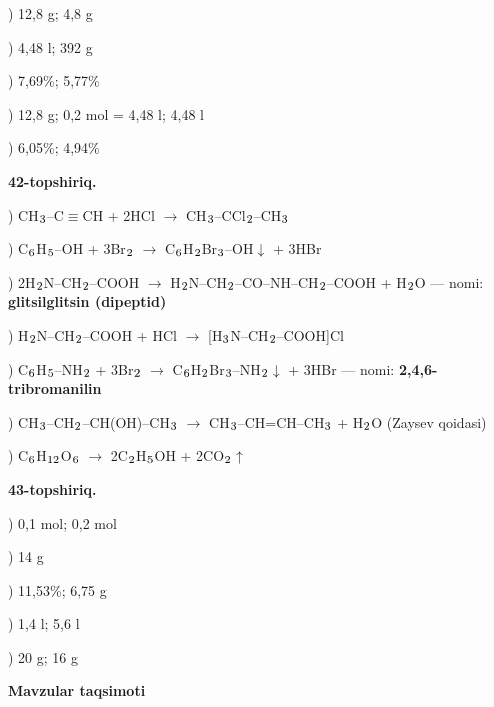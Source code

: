 \documentclass[11pt,a4paper]{article}
\renewcommand{\textsubscript}[1]{\ensuremath{_{\text{\fontsize{8}{8}\selectfont #1}}}}
\begin{document}
) 12,8 g; 4,8 g\par
{}) 4,48 l; 392 g\par
{}) 7,69\%; 5,77\%\par
{}) 12,8 g; 0,2 mol = 4,48 l; 4,48 l\par
{}) 6,05\%; 4,94\%\par
\noindent\textbf{42-topshiriq.}\par
{}) CH\textsubscript{3}--C$\equiv$CH + 2HCl $\to$ CH\textsubscript{3}--CCl\textsubscript{2}--CH\textsubscript{3}\par
{}) C\textsubscript{6}H\textsubscript{5}--OH + 3Br\textsubscript{2} $\to$ C\textsubscript{6}H\textsubscript{2}Br\textsubscript{3}--OH$\downarrow$ + 3HBr\par
{}) 2H\textsubscript{2}N--CH\textsubscript{2}--COOH $\to$ H\textsubscript{2}N--CH\textsubscript{2}--CO--NH--CH\textsubscript{2}--COOH + H\textsubscript{2}O --- nomi: \textbf{glitsilglitsin (dipeptid)}\par
{}) H\textsubscript{2}N--CH\textsubscript{2}--COOH + HCl $\to$ [H\textsubscript{3}N--CH\textsubscript{2}--COOH]Cl\par
{}) C\textsubscript{6}H\textsubscript{5}--NH\textsubscript{2} + 3Br\textsubscript{2} $\to$ C\textsubscript{6}H\textsubscript{2}Br\textsubscript{3}--NH\textsubscript{2}$\downarrow$ + 3HBr --- nomi: \textbf{2,4,6-tribromanilin}\par
{}) CH\textsubscript{3}--CH\textsubscript{2}--CH(OH)--CH\textsubscript{3} $\to$ CH\textsubscript{3}--CH=CH--CH\textsubscript{3} + H\textsubscript{2}O (Zaysev qoidasi)\par
{}) C\textsubscript{6}H\textsubscript{12}O\textsubscript{6} $\to$ 2C\textsubscript{2}H\textsubscript{5}OH + 2CO\textsubscript{2}$\uparrow$\par
\noindent\textbf{43-topshiriq.}\par
{}) 0,1 mol; 0,2 mol\par
{}) 14 g\par
{}) 11,53\%; 6,75 g\par
{}) 1,4 l; 5,6 l\par
{}) 20 g; 16 g\par
\par\bigskip\noindent\textbf{Mavzular taqsimoti}\par\smallskip
\end{document}
